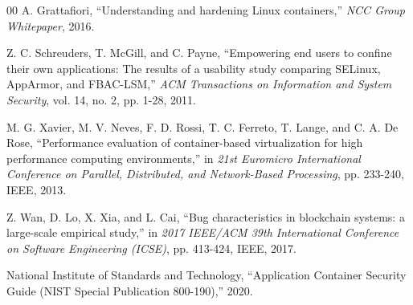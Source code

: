 \begin{thebibliography}{00}
 A. Grattafiori, ``Understanding and hardening Linux containers,'' \textit{NCC Group Whitepaper}, 2016.

 Z. C. Schreuders, T. McGill, and C. Payne, ``Empowering end users to confine their own applications: The results of a usability study comparing SELinux, AppArmor, and FBAC-LSM,'' \textit{ACM Transactions on Information and System Security}, vol. 14, no. 2, pp. 1-28, 2011.

 M. G. Xavier, M. V. Neves, F. D. Rossi, T. C. Ferreto, T. Lange, and C. A. De Rose, ``Performance evaluation of container-based virtualization for high performance computing environments,'' in \textit{21st Euromicro International Conference on Parallel, Distributed, and Network-Based Processing}, pp. 233-240, IEEE, 2013.

 Z. Wan, D. Lo, X. Xia, and L. Cai, ``Bug characteristics in blockchain systems: a large-scale empirical study,'' in \textit{2017 IEEE/ACM 39th International Conference on Software Engineering (ICSE)}, pp. 413-424, IEEE, 2017.

 National Institute of Standards and Technology, ``Application Container Security Guide (NIST Special Publication 800-190),'' 2020.
\end{thebibliography}

